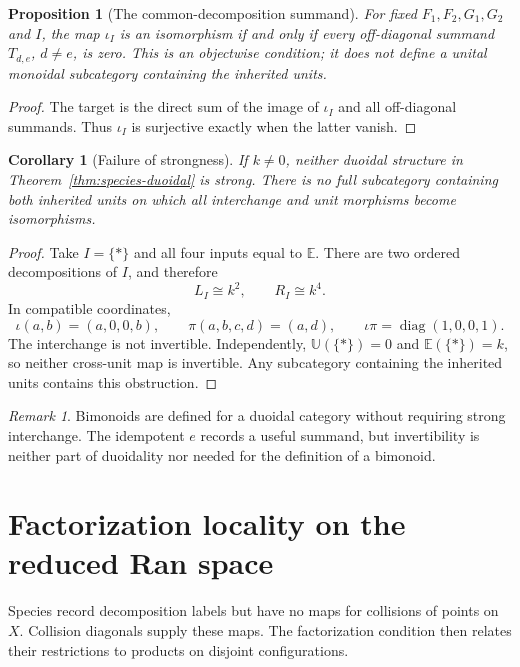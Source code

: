 \documentclass[11pt,reqno]{amsart}
\newtheorem{proposition}[theorem]{Proposition}
\newtheorem{corollary}[theorem]{Corollary}
\theoremstyle{definition}
\theoremstyle{remark}
\newtheorem{remark}[theorem]{Remark}
\begin{document}
\begin{proposition}[The common-decomposition summand]
\label{prop:common-summand}
For fixed \(F_1,F_2,G_1,G_2\) and \(I\), the map \(\iota_I\) is an
isomorphism if and only if every off-diagonal summand \(T_{d,e}\),
\(d\ne e\), is zero.  This is an objectwise condition; it does not
define a unital monoidal subcategory containing the inherited units.
\end{proposition}

\begin{proof}
The target is the direct sum of the image of \(\iota_I\) and all
off-diagonal summands.  Thus \(\iota_I\) is surjective exactly when the
latter vanish.
\end{proof}

\begin{corollary}[Failure of strongness]
\label{cor:not-strong}
If \(k\ne0\), neither duoidal structure in
Theorem~\ref{thm:species-duoidal} is strong.  There is no full
subcategory containing both inherited units on which all interchange
and unit morphisms become isomorphisms.
\end{corollary}

\begin{proof}
Take \(I=\{*\}\) and all four inputs equal to \(\mathbb E\).  There are
two ordered decompositions of \(I\), and therefore
\[
 L_I\cong k^2,\qquad R_I\cong k^4.
\]
In compatible coordinates,
\[
 \iota(a,b)=(a,0,0,b),\qquad
 \pi(a,b,c,d)=(a,d),\qquad
 \iota\pi=\operatorname{diag}(1,0,0,1).
\]
The interchange is not invertible.  Independently,
\(\mathbb U(\{*\})=0\) and \(\mathbb E(\{*\})=k\), so neither
cross-unit map is invertible.  Any subcategory containing the inherited
units contains this obstruction.
\end{proof}

\begin{remark}
Bimonoids are defined for a duoidal category without requiring strong
interchange.  The idempotent \(e\) records a useful summand, but
invertibility is neither part of duoidality nor needed for the
definition of a bimonoid.
\end{remark}

\section{Factorization locality on the reduced Ran space}

Species record decomposition labels but have no maps for collisions of
points on \(X\).  Collision diagonals supply these maps.  The
factorization condition then relates their restrictions to products on
disjoint configurations.
\end{document}
